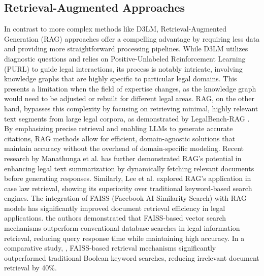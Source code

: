\subsection{Retrieval-Augmented Approaches}
In contrast to more complex methods like D3LM, Retrieval-Augmented Generation 
(RAG) approaches offer a compelling advantage by requiring less data and 
providing more straightforward processing pipelines. While D3LM utilizes 
diagnostic questions and relies on Positive-Unlabeled Reinforcement Learning 
(PURL) to guide legal interactions, its process is notably intricate, 
involving knowledge graphs that are highly specific to particular 
legal domains. This presents a limitation when the field of expertise changes, 
as the knowledge graph would need to be adjusted or rebuilt for different legal 
areas.
RAG, on the other hand, bypasses this complexity by focusing on retrieving 
minimal, highly relevant text segments from large legal corpora, as 
demonstrated by LegalBench-RAG \cite{pipitone2024legalbenchragbenchmarkretrievalaugmentedgeneration}. 
By emphasizing precise retrieval and enabling LLMs to generate accurate 
citations, RAG methods allow for efficient, domain-agnostic solutions that 
maintain accuracy without the overhead of domain-specific modeling. Recent 
research by Manathunga et al. \cite{manathunga2023retrievalaugmentedgenerationrepresentative} has 
further demonstrated RAG's potential in enhancing legal text summarization by dynamically 
fetching relevant documents before generating responses. Similarly, 
Lee et al. \cite{ryu-etal-2023-retrieval} explored RAG's application in case 
law retrieval, showing its superiority over traditional keyword-based search 
engines.
The integration of FAISS (Facebook AI Similarity Search) with RAG models has 
significantly improved document retrieval efficiency in legal applications. 
\cite{panchal2025lawpalretrievalaugmented} the authors demonstrated that FAISS-based vector 
search mechanisms outperform conventional database searches in legal 
information retrieval, reducing query response time while maintaining high accuracy. 
In a comparative study, \cite{zeng2023scalableeffectivegenerativeinformation}, FAISS-based 
retrieval mechanisms significantly outperformed traditional Boolean keyword searches, 
reducing irrelevant document retrieval by 40\%.
